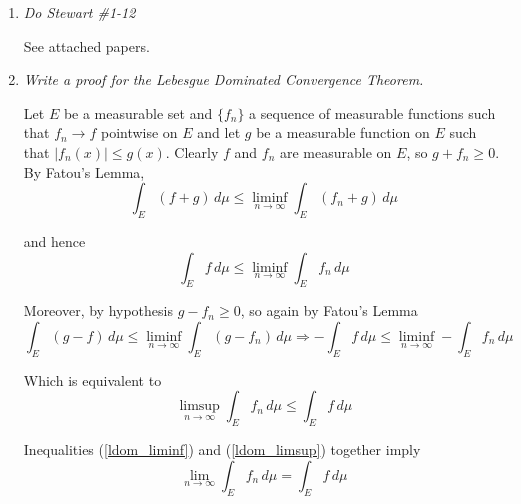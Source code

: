 \documentclass[11pt]{article}
\begin{document}
\begin{enumerate}
\item \emph{Do Stewart \#1-12}

See attached papers.

\item \emph{Write a proof for the Lebesgue Dominated Convergence Theorem.}

Let $E$ be a measurable set and $\{f_n\}$ a sequence of measurable functions such that $f_n \rightarrow f$ pointwise on $E$ and let $g$ be a measurable function on $E$ such that $|f_n(x)| \leq g(x)$.  Clearly $f$ and $f_n$ are measurable on $E$, so $g + f_n \geq 0$.  By Fatou's Lemma, 
\[
\int_E (f + g) \,d\mu \leq \liminf_{n \rightarrow \infty} \int_E (f_n + g) \,d\mu
\]

and hence
\begin{equation}
\label{ldom_liminf}
\int_E f \,d\mu \leq \liminf_{n \rightarrow \infty} \int_E f_n \,d\mu
\end{equation}

Moreover, by hypothesis $g - f_n \geq 0$, so again by Fatou's Lemma
\[
\int_E (g - f) \,d\mu \leq \liminf_{n \rightarrow \infty} \int_E (g - f_n) \,d\mu \Rightarrow -\int_E f \,d\mu \leq \liminf_{n \rightarrow \infty} -\int_E f_n \,d\mu
\]

Which is equivalent to 
\begin{equation}
\label{ldom_limsup}
\limsup_{n \rightarrow \infty} \int_E f_n \,d\mu \leq \int_E f \,d\mu
\end{equation}

Inequalities (\ref{ldom_liminf}) and (\ref{ldom_limsup}) together imply
\[
\lim_{n \rightarrow \infty} \int_E f_n \,d\mu = \int_E f \,d\mu
\]

\end{enumerate}
\end{document}
